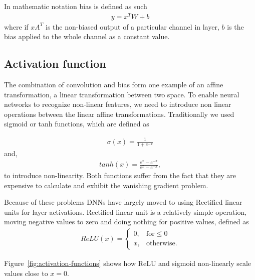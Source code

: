 \documentclass[12pt,a4paper,english
]{tunithesis}
\begin{document}
In mathematic notation bias is defined as such
\begin{align}
  y = x^{T}W + b
\end{align}
where if $xA^{T}$ is the non-biased output of a particular channel in layer, $b$ is the bias applied to the whole channel as a constant value.

\subsection{Activation function}
The combination of convolution and bias form one example of an affine transformation, a linear transformation between two space.
To enable neural networks to recognize non-linear features, we need to introduce non linear operations between the linear affine transformations. Traditionally we used sigmoid or tanh functions, which are defined as

\begin{align}
  \sigma(x) = \frac{1}{1+e^{-x}}
\end{align}
and,
\begin{align}
  tanh(x) = \frac{e^{x}-e^{-x}}{e^{x}-e^{-x}},
\end{align}
to introduce non-linearity. Both functions suffer from the fact that they are expensive to calculate and exhibit the vanishing gradient problem.~\parencite{DeepLearningBook}

Because of these problems DNNs have largely moved to using Rectified linear units for layer activations.
Rectified linear unit is a relatively simple operation, moving negative values to zero and doing nothing for positive values, defined as
\begin{align}
 ReLU(x) =
  \begin{cases}
  0, & \text{for} \leq 0 \\
    x, &  \text{otherwise}.
  \end{cases}
\end{align}

Figure~\ref{fig:activation-functions} shows how ReLU and sigmoid non-linearly scale values close to $x=0$.
\end{document}
